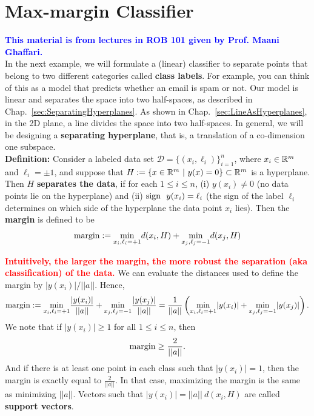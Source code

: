 
\section{Max-margin Classifier}
\label{sec:MaxMarginClassifier}

\textcolor{blue}{\bf This material is from lectures in ROB 101 given by Prof. Maani Ghaffari.}\\

In the next example, we will formulate a (linear) classifier to separate points that belong to two different categories called \textbf{class labels}. For example, you can think of this as a model that predicts whether an email is spam or not.  Our model is linear and separates the space into two half-spaces, as described in Chap.~\ref{sec:SeparatingHyperplanes}. As shown in Chap.~\ref{sec:LineAsHyperplanes}, in the 2D plane, a line divides the space into two half-spaces. In general, we will be designing a \textbf{separating hyperplane}, that is, a translation of a co-dimension one subspace.\\

\textbf{Definition:} Consider a labeled data set $\mathcal{D} = \{(x_i,\ell_i)\}_{i=1}^n$, where $x_i \in \mathbb R^m$ and $\ell_i = \pm 1$, and suppose that $H :=\{x \in \mathbb R^m~|~ y(x) = 0 \}\subset \mathbb R^m$ is a hyperplane. Then $H$ \textbf{separates the data}, if for each $1 \le i \le n$, (i) $y(x_i) \neq 0$ (no data points lie on the hyperplane) and (ii) ${\rm sign}~~y(x_i) = \ell_i$ (the sign of the label $\ell_i$ determines on which side of the hyperplane the data point $x_i$ lies). Then the \textbf{margin} is defined to be
\begin{equation}
\label{eq:marginDef}
{\rm margin}:= \underset{x_i, \ell_i = +1}{\min} d(x_i, H) + \underset{x_j, \ell_j = -1}{\min} d(x_j, H)
\end{equation}
   
\Qed

\begin{remark}  \textcolor{red}{\bf Intuitively, the larger the margin, the more robust the separation (aka classification) of the data. } We can evaluate the distances used to define the margin by $|y(x_i)|/||a||$. Hence, 
\begin{equation}
\label{eq:marginDef02}
{\rm margin}:= \underset{x_i, \ell_i = +1}{\min} \frac{|y(x_i)|}{||a||} + \underset{x_j, \ell_j = -1}{\min} \frac{|y(x_j)|}{||a||} = \frac{1}{||a||} \left(\underset{x_i, \ell_i = +1}{\min} |y(x_i)| + \underset{x_j, \ell_j = -1}{\min} |y(x_j)|\right).
\end{equation}
We note that if $|y(x_i)|\ge 1$ for all $1\le i \le n$, then 
$$ {\rm margin} \ge \frac{2}{||a||}.$$ And if there is at least one point in each class such that $|y(x_i)|=1$, then the margin is exactly equal to $ \frac{2}{||a||}$. In that case, maximizing the margin is the same as minimizing $||a||$. Vectors such that $|y(x_i)|=||a|| ~ d(x_i, H)$ are called \textbf{support vectors}. 
\end{remark}


